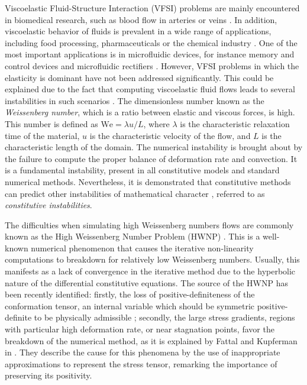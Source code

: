 \documentclass[11pt,english]{article}
\begin{document}
Viscoelastic Fluid-Structure Interaction (VFSI) problems are mainly encountered in biomedical research, such as blood flow in arteries or veins  \cite{bathe1999fluid,ma1992numerical,perktold1995computer,tang1999nonlinear}.  In addition, viscoelastic behavior of fluids is prevalent in a wide range of applications, including food processing, pharmaceuticals or the chemical industry \cite{squires2005microfluidics}. One of the most important applications is in microfluidic devices, for instance memory and control devices \cite{groisman2003microfluidic} and microfluidic rectifiers \cite{amani2018method}. However, VFSI problems in which the elasticity is dominant have not been addressed significantly. This could be explained due to the fact that computing viscoelastic fluid flows leads to several instabilities in such scenarios \cite{fattal2005time}. The dimensionless number known as the \textit{Weissenberg number}, which is a ratio between elastic and viscous forces, is high. This number is defined as $\text{We}=\lambda{u}/L$, where $\lambda$ is the characteristic relaxation time of the material, $u$ is the characteristic velocity of the flow, and $L$ is the characteristic length of the domain. The numerical instability is brought about by the failure to compute the proper balance of deformation rate and convection. It is a fundamental instability, present in all constitutive models and standard numerical methods. Nevertheless, it is demonstrated that constitutive methods can predict other instabilities of mathematical character \cite{leonov1992analysis,kwon2002recent}, referred to as \textit{constitutive instabilities}.


The difficulties when simulating high Weissenberg numbers flows are commonly known as the High Weissenberg Number Problem (HWNP) \cite{owens2002computationaltheology}. This is a well-known numerical phenomenon that causes the iterative non-linearity computations to breakdown for relatively low Weissenberg numbers. Usually, this manifests as a lack of convergence in the iterative method due to the hyperbolic nature of the differential constitutive equations.
The source of the HWNP has been recently identified: firstly, the loss of positive-definiteness of the conformation tensor, an internal variable which should be symmetric positive-definite to be physically admissible \cite{fattal2004, hulsen1997simulation}; secondly, the large stress gradients, regions with particular high deformation rate, or near stagnation points, favor the breakdown of the numerical method, as it is explained by Fattal and Kupferman in \cite{fattal2005time,fattal2004}. They describe the cause for this phenomena by the use of inappropriate approximations to represent the stress tensor, remarking the importance of preserving its positivity.
\end{document}
